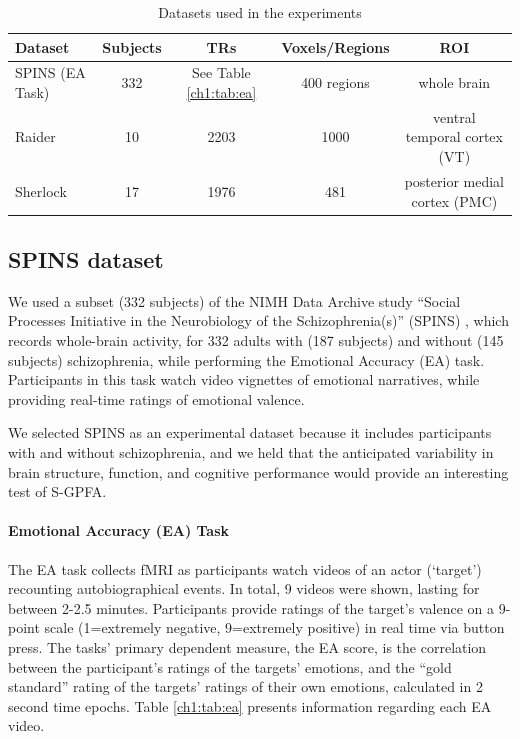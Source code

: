 \begin{table}[h!]
    \caption{Datasets used in the experiments}
    \label{ch1:tab:datasets}
    \centering \small
    \begin{tabular}{lcccc}
        \toprule
        \cmidrule(r){1-2}
        Dataset & Subjects  & TRs   & Voxels/Regions    & ROI\\
        \midrule
        SPINS (EA Task) \cite{spins} & 332   & See Table \ref{ch1:tab:ea}  & 400 regions \cite{schaefer2018local}  & whole brain \\
        Raider \cite{ha}  & 10    & 2203  & 1000   & ventral temporal cortex (VT) \\
        Sherlock\cite{sherlock}  & 17  & 1976   & 481 & posterior medial cortex (PMC) \\
        \bottomrule
    \end{tabular}
\end{table}


\subsection{SPINS dataset}
We used a subset (332 subjects) of the NIMH Data Archive study “Social Processes Initiative in the Neurobiology of the Schizophrenia(s)” (SPINS) \cite{spins}, which records whole-brain activity, for 332 adults with (187 subjects) and without (145 subjects) schizophrenia, while performing the Emotional Accuracy (EA) task. Participants in this task watch video vignettes of emotional narratives, while providing real-time ratings of emotional valence.

We selected SPINS as an experimental dataset because it includes participants with and without schizophrenia, and we held that the anticipated variability in brain structure, function, and cognitive performance would provide an interesting test of S-GPFA.

\paragraph{Emotional Accuracy (EA) Task}
The EA task collects fMRI as participants watch videos of an actor (‘target’) recounting autobiographical events. In total, 9 videos were shown, lasting for between 2-2.5 minutes. Participants provide ratings of the target’s valence on a 9-point scale (1=extremely negative, 9=extremely positive) in real time via button press. The tasks' primary dependent measure, the EA score, is the correlation between the participant’s ratings of the targets’ emotions, and the “gold standard” rating of the targets’ ratings of their own emotions, calculated in 2 second time epochs. Table \ref{ch1:tab:ea} presents information regarding each EA video.

